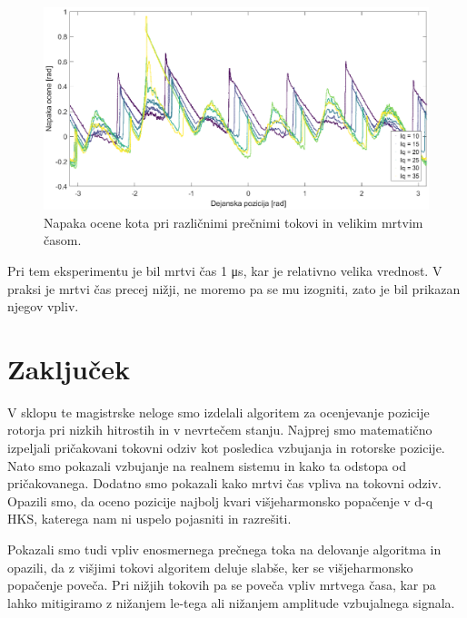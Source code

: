 \documentclass[a4paper,twoside,openright,12pt,slovene]{book}
\begin{document}
\begin{figure}[!htbp]
    \centering
    \includegraphics[width=1.05\columnwidth]{Slike/vsiljenaPozicijaTokoviZMrtvimCasom_angleError.eps}
    \caption{\label{vsiljenaPozicijaTokoviZMrtvimCasom_angleError} Napaka ocene kota pri različnimi prečnimi tokovi in velikim mrtvim časom. }
\end{figure}

Pri tem eksperimentu je bil mrtvi čas 1 μs, kar je relativno velika vrednost. V praksi je mrtvi čas precej nižji, ne moremo pa se mu izogniti, zato je bil prikazan njegov vpliv.

\chapter{Zaključek} \label{zakljucek}

V sklopu te magistrske neloge smo izdelali algoritem za ocenjevanje pozicije rotorja pri nizkih hitrostih in v nevrtečem stanju. Najprej smo matematično izpeljali pričakovani tokovni odziv kot
posledica vzbujanja in rotorske pozicije. Nato smo pokazali vzbujanje na realnem sistemu in kako ta odstopa od pričakovanega. Dodatno smo pokazali kako mrtvi čas vpliva na tokovni odziv. Opazili smo,
da oceno pozicije najbolj kvari višjeharmonsko popačenje v d-q HKS, katerega nam ni uspelo pojasniti in razrešiti. 

Pokazali smo tudi vpliv enosmernega prečnega toka na delovanje algoritma in opazili, da z višjimi tokovi algoritem deluje slabše, ker se višjeharmonsko popačenje poveča. Pri nižjih tokovih pa se
poveča vpliv mrtvega časa, kar pa lahko mitigiramo z nižanjem le-tega ali nižanjem amplitude vzbujalnega signala.
\end{document}
